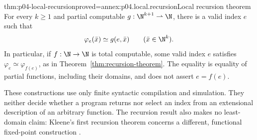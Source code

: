 \begin{hbtheorem}{thm:p04-local-recursion}{proved=annex:p04.local.recursion}{Local recursion theorem}
For every \(k\geq1\) and partial computable
\(g:\N^{k+1}\rightharpoonup\N\), there is a valid index \(e\) such that
\[
  \varphi_e(\bar x)\simeq g(e,\bar x)
  \qquad(\bar x\in\N^k).
\]
In particular, if \(f:\N\to\N\) is total computable, some valid index
\(e\) satisfies \(\varphi_e\simeq\varphi_{f(e)}\), as in
Theorem~\ref{thm:recursion-theorem}.  The equality is equality of partial
functions, including their domains, and does not assert \(e=f(e)\).
\end{hbtheorem}

These constructions use only finite syntactic compilation and simulation.
They neither decide whether a program returns nor select an index from an
extensional description of an arbitrary function.  The recursion result
also makes no least-domain claim: Kleene's first recursion theorem concerns
a different, functional fixed-point construction
\cite[\S66, Theorem XXVI and discussion, pp.~348--354]{Kleene1952}.
